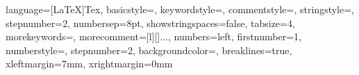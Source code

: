 
 {language={[LaTeX]Tex},
basicstyle=\small\ttfamily,             %
keywordstyle=\color{RoyalBlue},%
commentstyle=\color{Green}\ttfamily,
stringstyle=\rmfamily,
stepnumber=2,
numbersep=8pt,
showstringspaces=false,
	tabsize=4,                              %
	morekeywords={},
	morecomment=[l][\color{Blue}]{...},     %
	numbers=left,                           %
	firstnumber=1,                          %
	numberstyle=\tiny,          %
	stepnumber=2,                            %
	backgroundcolor=\color{red!8},
	breaklines=true,
	xleftmargin=7mm,
	xrightmargin=0mm
}

